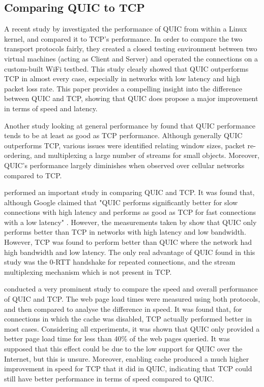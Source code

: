 \documentclass{l4proj}
\begin{document}
\subsection{Comparing QUIC to TCP}

A recent study by \citet{Wang2018} investigated the performance of QUIC from within a Linux kernel, and compared it to TCP's performance. In order to compare the two transport protocols fairly, they created a closed testing environment between two virtual machines (acting as Client and Server) and operated the connections on a custom-built WiFi testbed. This study clearly showed that QUIC outperforms TCP in almost every case, especially in networks with low latency and high packet loss rate. This paper provides a compelling insight into the difference between QUIC and TCP, showing that QUIC does propose a major improvement in terms of speed and latency. 

Another study looking at general performance by \citep{Kakh2017} found that QUIC performance tends to be at least as good as TCP performance. Although generally QUIC outperforms TCP, various issues were identified relating window sizes, packet re-ordering, and multiplexing a large number of streams for small objects. Moreover, QUIC's performance largely diminishes when observed over cellular networks compared to TCP.

\citet{Grat2016} performed an important study in comparing QUIC and TCP. It was found that, although Google claimed that "QUIC performs significantly better for slow connections with high latency and performs as good as TCP for fast connections with a low latency" \citep{Iyen2015}. However, the measurements taken by \citet{Grat2016} show that QUIC only performs better than TCP in networks with high latency and low bandwidth. However, TCP was found to perform better than QUIC where the network had high bandwidth and low latency. The only real advantage of QUIC found in this study was the 0-RTT handshake for repeated connections, and the stream multiplexing mechanism which is not present in TCP.

\citet{Nepomu2018} conducted a very prominent study to compare the speed and overall performance of QUIC and TCP. The web page load times were measured using both protocols, and then compared to analyse the difference in speed. It was found that, for connections in which the cache was disabled, TCP actually performed better in most cases. Considering all experiments, it was shown that QUIC only provided a better page load time for less than 40\% of the web pages queried. It was supposed that this effect could be due to the low support for QUIC over the Internet, but this is unsure. Moreover, enabling cache produced a much higher improvement in speed for TCP that it did in QUIC, indicating that TCP could still have better performance in terms of speed compared to QUIC.
\end{document}
